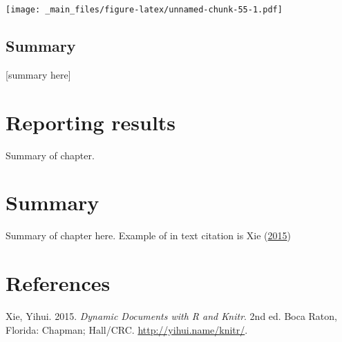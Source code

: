 \documentclass[]{book}
\theoremstyle{definition}
\theoremstyle{definition}
\theoremstyle{remark}
\begin{document}
\texttt{[image: \_main\_files/figure-latex/unnamed-chunk-55-1.pdf]}

\section{Summary}\label{summary-1}

{[}summary here{]}

\chapter{Reporting results}\label{reporting-results}

Summary of chapter.

\chapter{Summary}\label{summary-2}

Summary of chapter here. Example of in text citation is Xie
(\protect\hyperlink{ref-xie2015}{2015})

\chapter{References}\label{references}

\hypertarget{refs}{}
\hypertarget{ref-xie2015}{}
Xie, Yihui. 2015. \emph{Dynamic Documents with R and Knitr}. 2nd ed.
Boca Raton, Florida: Chapman; Hall/CRC. \url{http://yihui.name/knitr/}.
\end{document}
